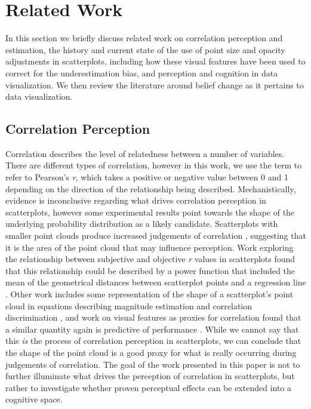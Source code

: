 \documentclass[manuscript,screen,review,anonymous]{acmart}
\begin{document}
\section{Related Work}\label{sec-rel-work-main}

In this section we briefly discuss related work on correlation
perception and estimation, the history and current state of the use of
point size and opacity adjustments in scatterplots, including how these
visual features have been used to correct for the underestimation bias,
and perception and cognition in data visualization. We then review the
literature around belief change as it pertains to data visualization.

\subsection{Correlation Perception}\label{sec-corr-percept}

Correlation describes the level of relatedness between a number of
variables. There are different types of correlation, however in this
work, we use the term to refer to Pearson's \emph{r}, which takes a
positive or negative value between 0 and 1 depending on the direction of
the relationship being described. Mechanistically, evidence is
inconclusive regarding what drives correlation perception in
scatterplots, however some experimental results point towards the shape
of the underlying probability distribution as a likely candidate.
Scatterplots with smaller point clouds produce increased judgements of
correlation \citep{cleveland_1982}, suggesting that it is the area of
the point cloud that may influence perception. Work exploring the
relationship between subjective and objective \emph{r} values in
scatterplots found that this relationship could be described by a power
function that included the mean of the geometrical distances between
scatterplot points and a regression line \citep{meyer_1997}. Other work
includes some representation of the shape of a scatterplot's point cloud
in equations describing magnitude estimation and correlation
discrimination \citep{meyer_1997, rensink_2017}, and work on visual
features as proxies for correlation found that a similar quantity again
is predictive of performance \citep{yang_2019}. While we cannot say that
this \emph{is} the process of correlation perception in scatterplots, we
can conclude that the shape of the point cloud is a good proxy for what
is really occurring during judgements of correlation. The goal of the
work presented in this paper is not to further illuminate what drives
the perception of correlation in scatterplots, but rather to investigate
whether proven perceptual effects can be extended into a cognitive
space.
\end{document}
